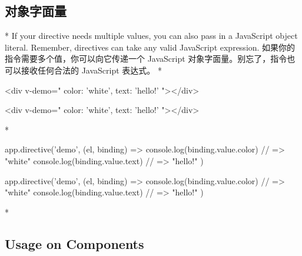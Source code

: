 \begin{paracol}{2}
\subsection{对象字面量}
\switchcolumn[0]*%
If your directive needs multiple values, you can also pass in a
JavaScript object literal. Remember, directives can take any valid
JavaScript expression.
\switchcolumn
如果你的指令需要多个值，你可以向它传递一个 JavaScript
对象字面量。别忘了，指令也可以接收任何合法的 JavaScript 表达式。
\switchcolumn[0]*%
\begin{codeHtml}
<div v-demo="{ color: 'white', text: 'hello!' }"></div>
\end{codeHtml}
\switchcolumn
\begin{codeHtml}
<div v-demo="{ color: 'white', text: 'hello!' }"></div>
\end{codeHtml}
\switchcolumn[0]*%
\begin{codeJs}
app.directive('demo', (el, binding) => {
  console.log(binding.value.color) // => "white"
  console.log(binding.value.text) // => "hello!"
})
\end{codeJs}
\switchcolumn
\begin{codeJs}
app.directive('demo', (el, binding) => {
  console.log(binding.value.color) // => "white"
  console.log(binding.value.text) // => "hello!"
})
\end{codeJs}
 
\switchcolumn[0]*%
\subsection{Usage on Components}
\switchcolumn

\end{paracol}
